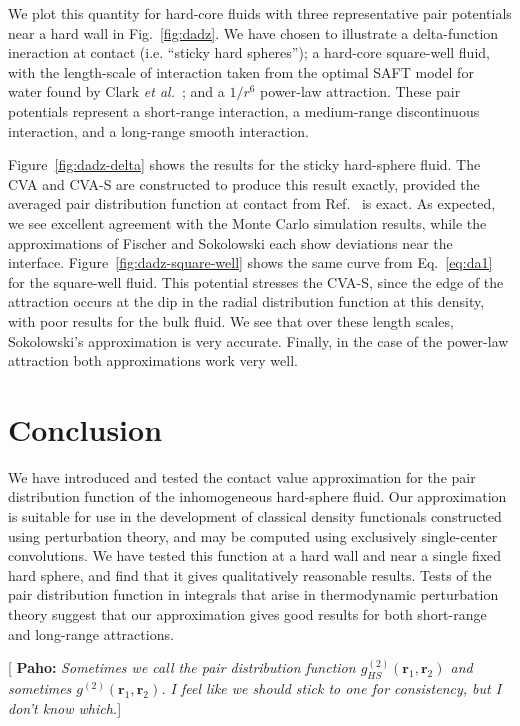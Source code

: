 \documentclass[letterpaper,twocolumn,amsmath,amssymb,pre,aps,10pt]{revtex4-1}
\newcommand{\green}[1]{{\bf \color{green} #1}}
\newcommand{\rr}{\textbf{r}}
\newcommand{\pahosays}[1]{{\color{red} [\green{Paho:} \emph{#1}]}}
\begin{document}
We plot this quantity for hard-core fluids with three representative
pair potentials near a hard wall in Fig.~\ref{fig:dadz}.  We have
chosen to illustrate a delta-function ineraction at contact
(i.e. ``sticky hard spheres''); a hard-core square-well fluid, with
the length-scale of interaction taken from the optimal SAFT model for
water found by Clark \emph{et al.}~\cite{clark2006developing}; and a
$1/r^6$ power-law attraction.  These pair potentials represent a
short-range interaction, a medium-range discontinuous interaction, and
a long-range smooth interaction.

Figure~\ref{fig:dadz-delta} shows the results for the sticky
hard-sphere fluid.  The CVA and CVA-S are constructed to produce this
result exactly, provided the averaged pair distribution function at
contact from Ref.~ is exact.  As expected,
we see excellent agreement with the Monte Carlo simulation results,
while the approximations of Fischer and Sokolowski each show
deviations near the interface.  Figure~\ref{fig:dadz-square-well}
shows the same curve from Eq.~\ref{eq:da1} for the square-well fluid.
This potential stresses the CVA-S, since the edge of the
attraction occurs at the dip in the radial distribution function at
this density, with poor results for the bulk fluid.  We see that over
these length scales, Sokolowski's approximation is very accurate.
Finally, in the case of the power-law attraction both approximations
work very well.

\section{Conclusion}

We have introduced and tested the contact value approximation for the pair
distribution function of the inhomogeneous hard-sphere fluid.  Our
approximation is suitable for use in the development of classical
density functionals constructed using perturbation theory, and
may be computed using exclusively single-center convolutions.  We have
tested this function at a hard wall and near a single fixed hard
sphere, and find that it gives qualitatively reasonable results.
Tests of the pair distribution function in integrals that arise in
thermodynamic perturbation theory suggest that our approximation gives
good results for both short-range and long-range attractions.

\pahosays{Sometimes we call the pair distribution function
  $g^{(2)}_{HS}(\rr_1,\rr_2)$ and sometimes $g^{(2)}(\rr_1,\rr_2)$. I feel
  like we should stick to one for consistency, but I don't know
  which.}

\end{document}
